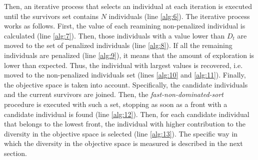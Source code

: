 Then, an iterative process that selects an individual at each iteration is executed until the survivors
set contains $N$ individuals (line \ref{alg:6}).
%
The iterative process works as follows.
%
First, the \DCN{} value of each reamining non-penalized individual is calculated (line \ref{alg:7}).
%
Then, those individuals with a \DCN{} value lower than $D_t$ are moved to the set of penalized individuals (line \ref{alg:8}).
%
If all the remaining individuals are penalized (line \ref{alg:9}), it means that the amount of exploration is lower than expected.
%
Thus, the individual with largest \DCN{} values is recovered, i.e. moved to the non-penalized individuals 
set (lines \ref{alg:10} and \ref{alg:11}).
%
Finally, the objective space is taken into account.
%
Specifically, the candidate individuals and the current survivors are joined.
%
Then, the \textit{fast-non-dominated-sort} procedure is executed with such a set, stopping as soon as a front with 
a candidate individual is found (line \ref{alg:12}).
%
Then, for each candidate individual that belongs to the lowest front, the individual with higher contribution to 
the diversity in the objective space is selected (line \ref{alg:13}).
%
The specific way in which the diversity in the objective space is measured is described in the next section.
%

%


%
%
%

%
%
%


